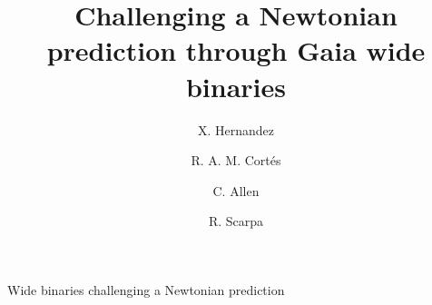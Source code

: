 \documentclass{ws-ijmpd}
\begin{document}
{Wide binaries challenging a Newtonian prediction}

%
\catchline{}{}{}{}{}
%

\title{Challenging a Newtonian prediction through Gaia wide binaries}

\author{X. Hernandez}

\address{Instituto de Astronom\'{\i}a, Universidad Nacional Aut\'{o}noma de M\'{e}xico, \\
 Apartado Postal 70--264 C.P. 04510 \\ M\'exico D.F. M\'exico.\\
xavier@astro.unam.mx}

\author{R. A. M. Cort\'es}

\address{Instituto de Astronom\'{\i}a, Universidad Nacional Aut\'{o}noma de M\'{e}xico, \\
 Apartado Postal 70--264 C.P. 04510 \\ M\'exico D.F. M\'exico.\\
rcortes@astro.unam.mx}

\author{C. Allen}

\address{Instituto de Astronom\'{\i}a, Universidad Nacional Aut\'{o}noma de M\'{e}xico, \\
 Apartado Postal 70--264 C.P. 04510 \\ M\'exico D.F. M\'exico.\\
chris@astro.unam.mx}


\author{R. Scarpa}

\address{Instituto de Astrof\'{\i}sica de Canarias, c/via Lactea s/n \\
San Cristobal de la Laguna 38205, Spain\\
Departamento de Astrof\'{\i}sica, Universidad de La Laguna (ULL)\\
38206 La Laguna, Tenerife, Spain.\\
riccardo.scarpa@gtc.iac.es}




\maketitle

\begin{history}
\end{history}
\end{document}
